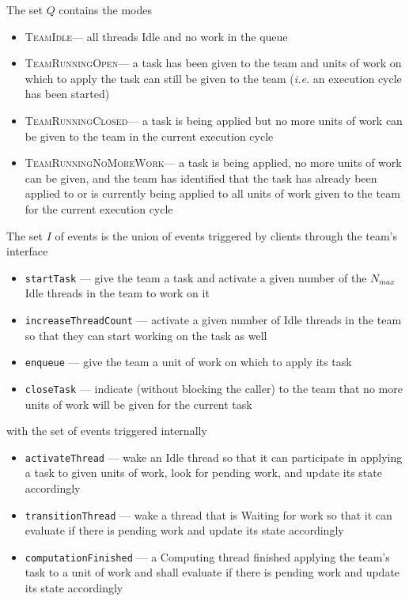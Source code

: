 \documentclass{article}
\newcommand{\TeamIdle}          {\textsc{TeamIdle}}
\newcommand{\TeamRunningOpen}   {\textsc{TeamRunningOpen}}
\newcommand{\TeamRunningClosed} {\textsc{TeamRunningClosed}}
\newcommand{\TeamRunningNoMoreWork} {\textsc{TeamRunningNoMoreWork}}
\newcommand{\TeamTerminating}   {\textsc{TeamTerminating}}
\begin{document}
The set $Q$ contains the modes
\begin{itemize}
\item{\TeamIdle --- all threads Idle and no work in the queue}
\item{\TeamRunningOpen --- a task has been given to the team and units of work
on which to apply the task can still be given to the team (\textit{i.e.} an
execution cycle has been started)}
\item{\TeamRunningClosed --- a task is being applied but no more units
of work can be given to the team in the current execution cycle}
\item{\TeamRunningNoMoreWork --- a task is being applied, no more
units of work can be given, and the team has identified that the task has
already been applied to or is currently being applied to all units of work given
to the team for the current execution cycle}
\end{itemize}

The set $I$ of events is the union of events triggered by clients through the
team's interface
\begin{itemize}
\item{\texttt{startTask} --- give the team a task and activate a given number of the
$N_{max}$ Idle threads in the team to work on it}
\item{\texttt{increaseThreadCount} --- activate a given number of Idle threads in the
team so that they can start working on the task as well}
\item{\texttt{enqueue} --- give the team a unit of work on which to apply its
task}
\item{\texttt{closeTask} --- indicate (without blocking the caller) to the team
that no more units of work will be given for the current task}
\end{itemize}
with the set of events triggered internally
\begin{itemize}
\item{\texttt{activateThread} --- wake an Idle thread so that it can participate
in applying a task to given units of work, look for pending work, and update its
state accordingly}
\item{\texttt{transitionThread} --- wake a thread that is Waiting for work so
that it can evaluate if there is pending work and update its state accordingly}
\item{\texttt{computationFinished} --- a Computing thread finished applying the team's
task to a unit of work and shall evaluate if there is pending work and update
its state accordingly}
\end{itemize}
\end{document}
